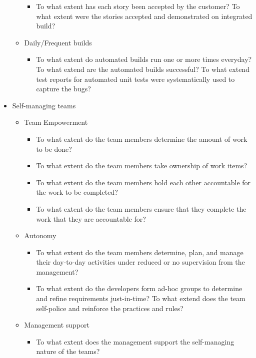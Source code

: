 \begin{appendices}
\begin{itemize}
\begin{itemize}
\begin{itemize}
					\item To what extent has each story been accepted by the customer? 
					\addition To what extent were the stories accepted and demonstrated on integrated build?
				\end{itemize}
			\item Daily/Frequent builds
				\begin{itemize}
					\item To what extent do automated builds run one or more times everyday?
					\addition To what extend are the automated builds successful?
					\addition To what extend test reports for automated unit tests were systematically used to capture the bugs?
				\end{itemize}
		\end{itemize}

	\item Self-managing teams
		\begin{itemize}
			\item Team Empowerment
				\begin{itemize}
					\item To what extent do the team members determine the amount of work to be done? 
					\item To what extent do the team members take ownership of work items? 
					\item To what extent do the team members hold each other accountable for the work to be completed? 
					\item To what extent do the team members ensure that they complete the work that they are accountable for?
				\end{itemize}
			\item Autonomy
				\begin{itemize}
					\item To what extent do the team members determine, plan, and manage their day-to-day activities under reduced or no supervision from the management? 
					\item To what extent do the developers form ad-hoc groups to determine and refine requirements just-in-time?
					\addition To what extend does the team self-police and reinforce the practices and rules?
				\end{itemize}
			\item Management support
				\begin{itemize}
					\item To what extent does the management support the self-managing nature of the teams?

\end{itemize}
\end{itemize}
\end{itemize}
\end{appendices}
